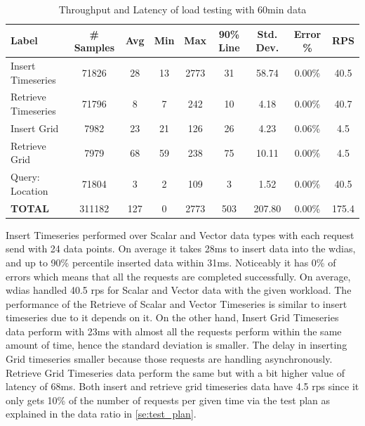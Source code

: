 \begin{table}[ht]
\caption{Throughput and Latency of load testing with 60min data}
\footnotesize
\begin{tabulary}{\linewidth}{|L|C|C|C|C|C|C|C|C|}
\hline
Label & \# Samples & Avg & Min & Max & 90\% Line & Std. Dev. & Error \% & RPS \\ \hline
Insert Timeseries & 71826 & 28 & 13 & 2773 & 31 & 58.74 & 0.00\% & 40.5 \\ \hline
Retrieve Timeseries & 71796 & 8 & 7 & 242 & 10 & 4.18 & 0.00\% & 40.7 \\ \hline
Insert Grid & 7982 & 23 & 21 & 126 & 26 & 4.23 & 0.06\% & 4.5 \\ \hline
Retrieve Grid & 7979 & 68 & 59 & 238 & 75 & 10.11 & 0.00\% & 4.5 \\ \hline
Query: Location & 71804 & 3 & 2 & 109 & 3 & 1.52 & 0.00\% & 40.5 \\ \hline
\textbf{TOTAL} & 311182 & 127 & 0 & 2773 & 503 & 207.80 & 0.00\% & 175.4 \\ \hline
\end{tabulary}
\label{tab:obs_all_60_min_summary}
\end{table}
Insert Timeseries performed over Scalar and Vector data types with each request send with 24 data points. On average it takes 28ms to insert data into the \acrshort{wdias}, and up to 90\% percentile inserted data within 31ms. Noticeably it has 0\% of errors which means that all the requests are completed successfully. On average, \acrshort{wdias} handled 40.5 \acrshort{rps} for Scalar and Vector data with the given workload. The performance of the Retrieve of Scalar and Vector Timeseries is similar to insert timeseries due to it depends on it.
On the other hand, Insert Grid Timeseries data perform with 23ms with almost all the requests perform within the same amount of time, hence the standard deviation is smaller. The delay in inserting Grid timeseries smaller because those requests are handling asynchronously. Retrieve Grid Timeseries data perform the same but with a bit higher value of latency of 68ms. Both insert and retrieve grid timeseries data have 4.5 \acrshort{rps} since it only gets 10\% of the number of requests per given time via the test plan as explained in the data ratio in \cref{se:test_plan}.


